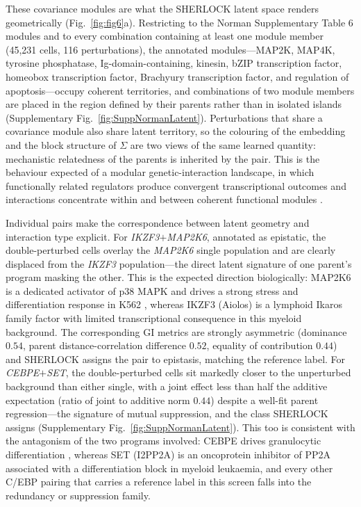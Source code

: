 These covariance modules are what the SHERLOCK latent space renders geometrically
(Fig.~\ref{fig:fig6}a). Restricting to the Norman Supplementary Table 6 modules and to every
combination containing at least one module member (45,231 cells, 116 perturbations), the annotated
modules---MAP2K, MAP4K, tyrosine phosphatase, Ig-domain-containing, kinesin, bZIP transcription
factor, homeobox transcription factor, Brachyury transcription factor, and regulation of
apoptosis---occupy coherent territories, and combinations of two module members are placed in the
region defined by their parents rather than in isolated islands
(Supplementary Fig.~\ref{fig:SuppNormanLatent}). Perturbations that share a covariance module also
share latent territory, so the colouring of the embedding and the block structure of $\Sigma$ are two
views of the same learned quantity: mechanistic relatedness of the parents is inherited by the pair.
This is the behaviour expected of a modular genetic-interaction landscape, in which functionally
related regulators produce convergent transcriptional outcomes and interactions concentrate within
and between coherent functional modules \cite{norman2019exploring,horlbeck2018mapping}.

Individual pairs make the correspondence between latent geometry and interaction type explicit. For
\textit{IKZF3}$+$\textit{MAP2K6}, annotated as epistatic, the double-perturbed cells overlay the
\textit{MAP2K6} single population and are clearly displaced from the \textit{IKZF3} population---the
direct latent signature of one parent's program masking the other. This is the expected direction
biologically: MAP2K6 is a dedicated activator of p38 MAPK and drives a strong stress and
differentiation response in K562 \cite{cuenda2007p38}, whereas IKZF3 (Aiolos) is a lymphoid Ikaros
family factor with limited transcriptional consequence in this myeloid background. The corresponding
GI metrics are strongly asymmetric (dominance $0.54$, parent distance-correlation difference $0.52$,
equality of contribution $0.44$) and SHERLOCK assigns the pair to epistasis, matching the reference
label. For \textit{CEBPE}$+$\textit{SET}, the double-perturbed cells sit markedly closer to the
unperturbed background than either single, with a joint effect less than half the additive
expectation (ratio of joint to additive norm $0.44$) despite a well-fit parent regression---the
signature of mutual suppression, and the class SHERLOCK assigns
(Supplementary Fig.~\ref{fig:SuppNormanLatent}). This too is consistent with the antagonism of the
two programs involved: CEBPE drives granulocytic differentiation \cite{friedman2007cebp}, whereas SET
(I2PP2A) is an oncoprotein inhibitor of PP2A associated with a differentiation block in myeloid
leukaemia, and every other C/EBP pairing that carries a reference label in this screen falls into the
redundancy or suppression family.

